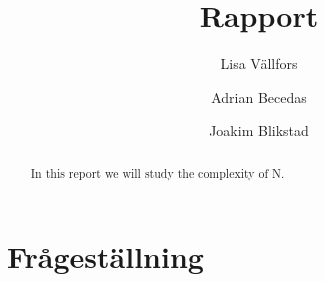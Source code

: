 \documentclass[a4paper]{report}
\title{Rapport}
\author{Lisa Vällfors \and Adrian Becedas \and Joakim Blikstad}
\begin{document}
\maketitle

\begin{abstract}
    In this report we will study the complexity of N.
\end{abstract}

\section*{Frågeställning}
\end{document}
